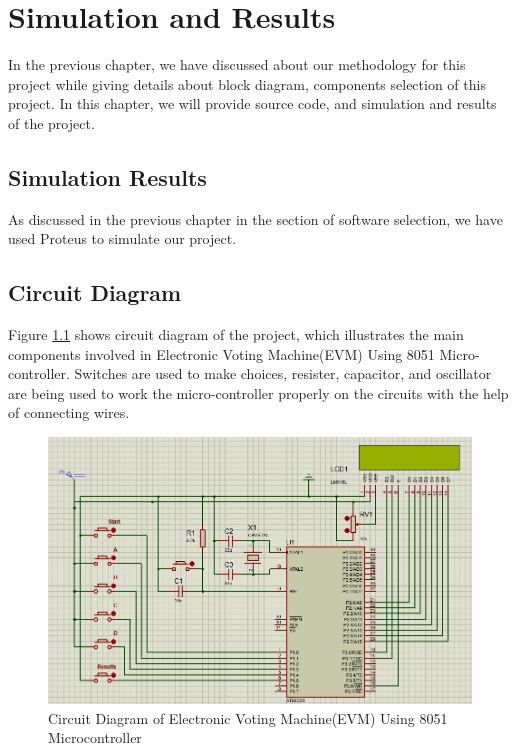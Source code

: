 \chapter{Simulation and Results}
\label{chap4}
In the previous chapter, we have discussed about our methodology for this project while giving details about block diagram, components selection of this project. In this chapter, we will provide source code, and simulation and results of the project.
\section{Simulation Results}
As discussed in the previous chapter in the section of software selection, we have used Proteus to simulate our project.
\section{Circuit Diagram}
Figure \ref{simulation1} shows circuit diagram of the project, which illustrates the main components involved
in Electronic Voting Machine(EVM) Using 8051 Micro-controller. Switches are used to make choices, resister, capacitor, and oscillator are being used to work the micro-controller properly on the circuits with the help of connecting wires.
\begin{figure}[H]  %
\begin{center}
\includegraphics[scale=0.40]{Chapter4/simulation1}
\caption{Circuit Diagram of Electronic Voting Machine(EVM) Using 8051 Microcontroller}
\label{simulation1}
\end{center}
\end{figure}
